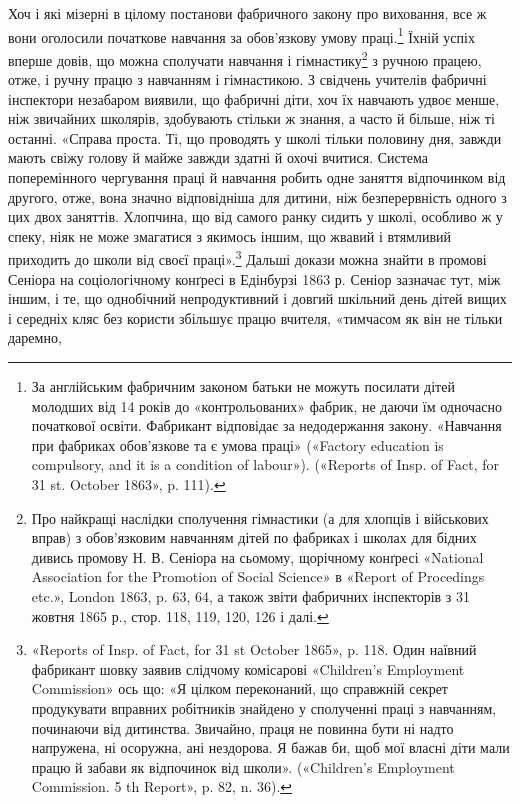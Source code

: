 Хоч і які мізерні в цілому постанови фабричного закону про
виховання, все ж вони оголосили початкове навчання за обов’язкову
умову праці.\footnote{
За англійським фабричним законом батьки не можуть посилати
дітей молодших від 14 років до «контрольованих» фабрик, не даючи
їм одночасно початкової освіти. Фабрикант відповідає за недодержання
закону. «Навчання при фабриках обов'язкове та є умова праці» («Factory
education is compulsory, and it is a condition of labour»). («Reports of
Insp. of Fact, for 31 st. October 1863», p. 111).
} Їхній успіх вперше довів, що можна сполучати
навчання і гімнастику\footnote{
Про найкращі наслідки сполучення гімнастики (а для хлопців
і військових вправ) з обов’язковим навчанням дітей по фабриках і школах
для бідних дивись промову Н. В. Сеніора на сьомому, щорічному конґресі
«National Association for the Promotion of Social Science» в «Report
of Procedings etc.», London 1863, p. 63, 64, а також звіти фабричних інспекторів
з 31 жовтня 1865 р., стор. 118, 119, 120, 126 і далі.
} з ручною працею, отже, і ручну
працю з навчанням і гімнастикою. З свідчень учителів фабричні
інспектори незабаром виявили, що фабричні діти, хоч їх навчають
удвоє менше, ніж звичайних школярів, здобувають стільки ж
знання, а часто й більше, ніж ті останні. «Справа проста. Ті, що
проводять у школі тільки половину дня, завжди мають свіжу
голову й майже завжди здатні й охочі вчитися. Система поперемінного
чергування праці й навчання робить одне заняття відпочинком
від другого, отже, вона значно відповідніша для дитини,
ніж безперервність одного з цих двох заняттів. Хлопчина, що від
самого ранку сидить у школі, особливо ж у спеку, ніяк не може
змагатися з якимось іншим, що жвавий і втямливий приходить до
школи від своєї праці».\footnote{
«Reports of Insp. of Fact, for 31 st October 1865», p. 118. Один
наївний фабрикант шовку заявив слідчому комісарові «Children’s Employment
Commission» ось що: «Я цілком переконаний, що справжній секрет
продукувати вправних робітників знайдено у сполученні праці з навчанням,
починаючи від дитинства. Звичайно, праця не повинна бути ні
надто напружена, ні осоружна, ані нездорова. Я бажав би, щоб мої
власні діти мали працю й забави як відпочинок від школи». («Children’s
Employment Commission. 5 th Report», p. 82, n. 36).
} Дальші докази можна знайти в промові
Сеніора на соціологічному конґресі в Едінбурзі 1863 р. Сеніор
зазначає тут, між іншим, і те, що однобічний непродуктивний і
довгий шкільний день дітей вищих і середніх кляс без користи
збільшує працю вчителя, «тимчасом як він не тільки даремно,
